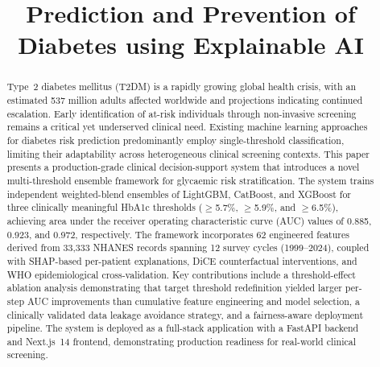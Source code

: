 \documentclass[conference]{IEEEtran}
\begin{document}
\title{Prediction and Prevention of Diabetes using Explainable AI}

\author{
\and
{}
}

\maketitle

\begin{abstract}
Type~2 diabetes mellitus (T2DM) is a rapidly growing global health crisis, with an estimated 537 million adults affected worldwide and projections indicating continued escalation. Early identification of at-risk individuals through non-invasive screening remains a critical yet underserved clinical need. Existing machine learning approaches for diabetes risk prediction predominantly employ single-threshold classification, limiting their adaptability across heterogeneous clinical screening contexts. This paper presents a production-grade clinical decision-support system that introduces a novel multi-threshold ensemble framework for glycaemic risk stratification. The system trains independent weighted-blend ensembles of LightGBM, CatBoost, and XGBoost for three clinically meaningful HbA1c thresholds ($\geq$5.7\%, $\geq$5.9\%, and $\geq$6.5\%), achieving area under the receiver operating characteristic curve (AUC) values of 0.885, 0.923, and 0.972, respectively. The framework incorporates 62 engineered features derived from 33,333 NHANES records spanning 12 survey cycles (1999--2024), coupled with SHAP-based per-patient explanations, DiCE counterfactual interventions, and WHO epidemiological cross-validation. Key contributions include a threshold-effect ablation analysis demonstrating that target threshold redefinition yielded larger per-step AUC improvements than cumulative feature engineering and model selection, a clinically validated data leakage avoidance strategy, and a fairness-aware deployment pipeline. The system is deployed as a full-stack application with a FastAPI backend and Next.js~14 frontend, demonstrating production readiness for real-world clinical screening.
\end{abstract}
\end{document}
